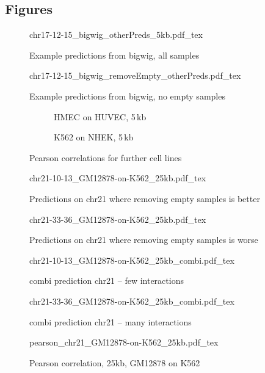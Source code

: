\begin{appendices}
\section*{Figures}
\begin{figure}[h]
 \centering
 \scriptsize
 {chr17-12-15_bigwig_otherPreds_5kb.pdf_tex}
 \caption{Example predictions from bigwig, all samples}
 \label{fig:app:bw:others:5k}
\end{figure}
\begin{figure}[hb]
 \centering
 \scriptsize
 {chr17-12-15_bigwig_removeEmpty_otherPreds.pdf_tex}
 \caption{Example predictions from bigwig, no empty samples}
 \label{fig:app:bw:noEmpty:others:5k}
\end{figure}
\begin{figure}[hb]
\centering
\begin{subfigure}{0.495\textwidth}
 \centering
 \caption{HMEC on HUVEC, 5\,kb}
 \label{fig:app:Pearson:HMEC:HUVEC:5k}
\end{subfigure}\hfill
\begin{subfigure}{0.495\textwidth}
 \centering
 \caption{K562 on NHEK, 5\,kb}
 \label{fig:app:Pearson:K562:NHEK:5k}
 \end{subfigure}
 \caption{Pearson correlations for further cell lines}
 \label{fig:app:Pearson:furtherCellLines}
\end{figure}
\begin{figure}[hb]
 \centering
 \scriptsize
 {chr21-10-13_GM12878-on-K562_25kb.pdf_tex}
 \caption{Predictions on chr21 where removing empty samples is better}
 \label{fig:app:GM12878:K562:chr21:25k:goodToRemove}
\end{figure}
\begin{figure}[hb]
 \centering
 \scriptsize
 {chr21-33-36_GM12878-on-K562_25kb.pdf_tex}
 \caption{Predictions on chr21 where removing empty samples is worse}
 \label{fig:app:GM12878:K562:chr21:25k:badToRemove}
\end{figure}

\begin{figure}[hb]
 \centering
 \scriptsize
 {chr21-10-13_GM12878-on-K562_25kb_combi.pdf_tex}
 \caption{combi prediction chr21 -- few interactions}
 \label{fig:app:GM12878:K562:chr21:25k:combiFew}
\end{figure}
\begin{figure}[hb]
 \centering
 \scriptsize
 {chr21-33-36_GM12878-on-K562_25kb_combi.pdf_tex}
 \caption{combi prediction chr21 -- many interactions}
 \label{fig:app:GM12878:K562:chr21:25k:combiMany}
\end{figure}
\begin{figure}[hb]
 \centering
 \scriptsize
 {pearson_chr21_GM12878-on-K562_25kb.pdf_tex}
 \caption{Pearson correlation, 25kb, GM12878 on K562}
 \label{fig:app:Pearson:GM12878:K562:chr21:25kb}
\end{figure}


\end{appendices}
